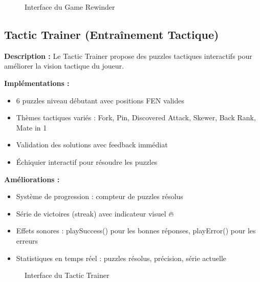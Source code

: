 \documentclass[a4paper,12pt]{article}
\begin{document}
\begin{figure}[h]
    \centering
    \caption{Interface du Game Rewinder}
    \label{fig:rewinder}
\end{figure}

\subsection{Tactic Trainer (Entraînement Tactique)}

\textbf{Description :}
Le Tactic Trainer propose des puzzles tactiques interactifs pour améliorer la vision tactique du joueur.

\textbf{Implémentations :}
\begin{itemize}
    \item 6 puzzles niveau débutant avec positions FEN valides
    \item Thèmes tactiques variés : Fork, Pin, Discovered Attack, Skewer, Back Rank, Mate in 1
    \item Validation des solutions avec feedback immédiat
    \item Échiquier interactif pour résoudre les puzzles
\end{itemize}

\textbf{Améliorations :}
\begin{itemize}
    \item Système de progression : compteur de puzzles résolus
    \item Série de victoires (streak) avec indicateur visuel 🔥
    \item Effets sonores : playSuccess() pour les bonnes réponses, playError() pour les erreurs
    \item Statistiques en temps réel : puzzles résolus, précision, série actuelle
\end{itemize}

\begin{figure}[h]
    \centering
    \caption{Interface du Tactic Trainer}
    \label{fig:tactics}
\end{figure}
\end{document}
